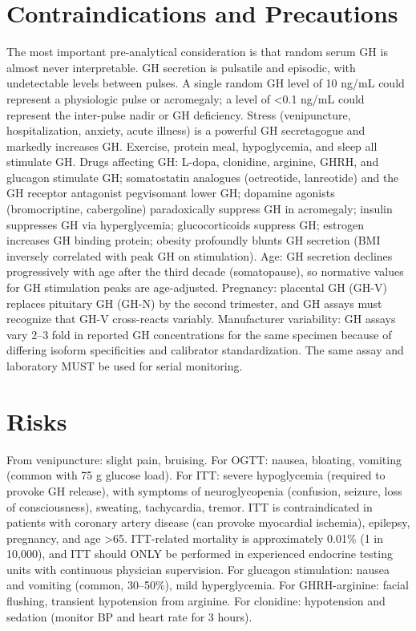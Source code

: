 \section*{Contraindications and Precautions}
The most important pre-analytical consideration is that random serum GH is almost never interpretable. GH secretion is pulsatile and episodic, with undetectable levels between pulses. A single random GH level of 10 ng/mL could represent a physiologic pulse or acromegaly; a level of <0.1 ng/mL could represent the inter-pulse nadir or GH deficiency. Stress (venipuncture, hospitalization, anxiety, acute illness) is a powerful GH secretagogue and markedly increases GH. Exercise, protein meal, hypoglycemia, and sleep all stimulate GH. Drugs affecting GH: L-dopa, clonidine, arginine, GHRH, and glucagon stimulate GH; somatostatin analogues (octreotide, lanreotide) and the GH receptor antagonist pegvisomant lower GH; dopamine agonists (bromocriptine, cabergoline) paradoxically suppress GH in acromegaly; insulin suppresses GH via hyperglycemia; glucocorticoids suppress GH; estrogen increases GH binding protein; obesity profoundly blunts GH secretion (BMI inversely correlated with peak GH on stimulation). Age: GH secretion declines progressively with age after the third decade (somatopause), so normative values for GH stimulation peaks are age-adjusted. Pregnancy: placental GH (GH-V) replaces pituitary GH (GH-N) by the second trimester, and GH assays must recognize that GH-V cross-reacts variably. Manufacturer variability: GH assays vary 2--3 fold in reported GH concentrations for the same specimen because of differing isoform specificities and calibrator standardization. The same assay and laboratory MUST be used for serial monitoring.

\section*{Risks}
From venipuncture: slight pain, bruising. For OGTT: nausea, bloating, vomiting (common with 75 g glucose load). For ITT: severe hypoglycemia (required to provoke GH release), with symptoms of neuroglycopenia (confusion, seizure, loss of consciousness), sweating, tachycardia, tremor. ITT is contraindicated in patients with coronary artery disease (can provoke myocardial ischemia), epilepsy, pregnancy, and age >65. ITT-related mortality is approximately 0.01\% (1 in 10,000), and ITT should ONLY be performed in experienced endocrine testing units with continuous physician supervision. For glucagon stimulation: nausea and vomiting (common, 30--50\%), mild hyperglycemia. For GHRH-arginine: facial flushing, transient hypotension from arginine. For clonidine: hypotension and sedation (monitor BP and heart rate for 3 hours).

